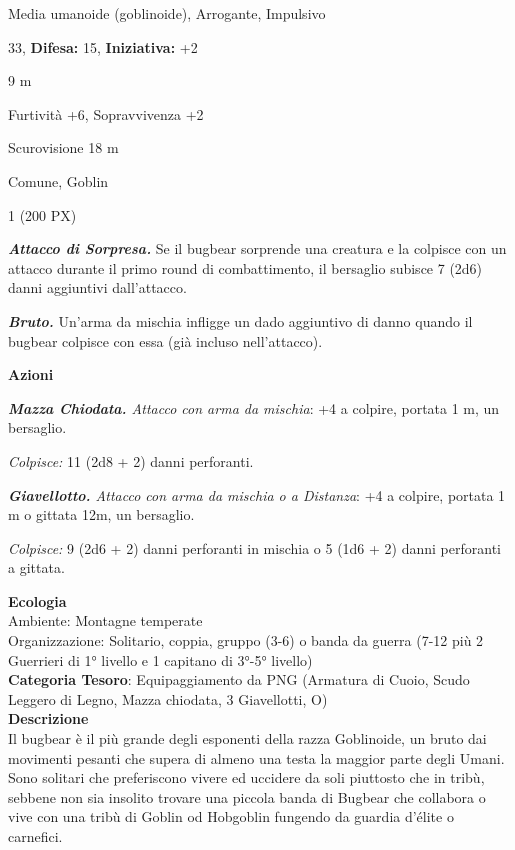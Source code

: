 \begin{multicols}{2}
{
\noindent
\begin{description}[noitemsep, topsep=0pt, parsep=0pt, partopsep=0pt, leftmargin=0cm, labelwidth=2.2cm]
	\item[\textbf{Taglia/Tipo:}] Media umanoide (goblinoide), Arrogante, Impulsivo
	\item[\textbf{Caratt.:}] 
	\item[\textbf{Punti Ferita:}] 33,  \textbf{Difesa:} 15,  \textbf{Iniziativa:} +2
	\item[\textbf{Movimento:}] 9 m
	\item[\textbf{Tiri Salvez.:}] 
	\item[\textbf{Comp.:}] Furtività +6, Sopravvivenza +2
	\item[\textbf{Sensi:}] Scurovisione 18 m
	\item[\textbf{Linguaggi:}] Comune, Goblin
	\item[\textbf{Sfida:}] 1 (200 PX)\smallskip
\end{description}

\emph{\textbf{Attacco di Sorpresa.}} Se il bugbear sorprende una creatura e la colpisce con un attacco durante il primo round di combattimento, il bersaglio subisce 7 (2d6) danni aggiuntivi dall'attacco.

\emph{\textbf{Bruto.}} Un'arma da mischia infligge un dado aggiuntivo di danno quando il bugbear colpisce con essa (già incluso nell'attacco).

\textbf{Azioni}

\emph{\textbf{Mazza Chiodata.} Attacco con arma da mischia}: +4 a colpire, portata 1 m, un bersaglio.

\emph{Colpisce:} 11 (2d8 + 2) danni perforanti.

\emph{\textbf{Giavellotto.} Attacco con arma da mischia o a Distanza}: +4 a colpire, portata 1 m o gittata 12m, un bersaglio.

\emph{Colpisce:} 9 (2d6 + 2) danni perforanti in mischia o 5 (1d6 + 2) danni perforanti a gittata.

\textbf{Ecologia}\\
Ambiente: Montagne temperate\\
Organizzazione: Solitario, coppia, gruppo (3-6) o banda da guerra (7-12 più 2 Guerrieri di 1° livello e 1 capitano di 3°-5° livello)\\
\textbf{Categoria Tesoro}: Equipaggiamento da PNG (Armatura di Cuoio, Scudo Leggero di Legno, Mazza chiodata, 3 Giavellotti, O)\\
\textbf{Descrizione}\\
Il bugbear è il più grande degli esponenti della razza Goblinoide, un bruto dai movimenti pesanti che supera di almeno una testa la maggior parte degli Umani. Sono solitari che preferiscono vivere ed uccidere da soli piuttosto che in tribù, sebbene non sia insolito trovare una piccola banda di Bugbear che collabora o vive con una tribù di Goblin od Hobgoblin fungendo da guardia d'élite o carnefici.

}
\end{multicols}
